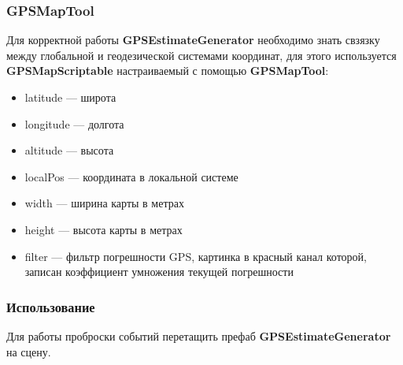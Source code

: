 \documentclass[a4paper, 11pt, titlepage]{article}
\begin{document}
      \subsubsection{GPSMapTool}
        Для корректной работы \textbf{GPSEstimateGenerator} необходимо знать свзязку между глобальной и геодезической системами координат, для 
        этого используется \textbf{GPSMapScriptable} настраиваемый с помощью \textbf{GPSMapTool}:
        \begin{center}
        \end{center}
        \begin{itemize}
          \item latitude --- широта
          \item longitude --- долгота
          \item altitude --- высота
          \item localPos --- координата в локальной системе
          \item width --- ширина карты в метрах
          \item height --- высота карты в метрах
          \item filter --- фильтр погрешности GPS, картинка в красный канал которой, записан коэффициент умножения текущей погрешности
        \end{itemize}
      \subsubsection{Использование}
        Для работы проброски событий перетащить префаб \textbf{GPSEstimateGenerator} на сцену.
\end{document}
